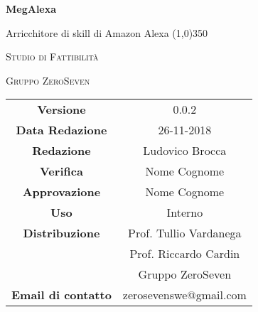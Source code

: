 \documentclass[a4paper,12pt]{book}
\author{Mirko Franco}
\date{26-11-2018}
\begin{document}
\begin{titlepage}
	\centering
	{\huge\bfseries MegAlexa\par}
	Arricchitore di skill di Amazon Alexa
	\line(1,0){350} \\
	{\scshape\LARGE Studio di Fattibilità \par}
	\vspace{1cm}
	{\scshape Gruppo ZeroSeven \par}
	\logo
	\begin{tabular}{c|c}
		{\hfill \textbf{Versione}} 			& 0.0.2				\\
		{\hfill\textbf{Data Redazione}} 	& 26-11-2018		\\ 
		{\hfill\textbf{Redazione}} 			&  		Ludovico Brocca			\\ 
		{\hfill\textbf{Verifica}} 				&  	Nome Cognome				\\ 
		{\hfill\textbf{Approvazione}} 		&  		Nome Cognome			\\ 
		{\hfill\textbf{Uso}} 					& 		Interno		\\ 
		{\hfill\textbf{Distribuzione}} 			& 			Prof. Tullio Vardanega \\ & Prof. Riccardo Cardin \\ & Gruppo ZeroSeven		\\ 
		{\hfill\textbf{Email di contatto}} & zerosevenswe@gmail.com \\
	\end{tabular}
\end{titlepage}
	

	
\label{LastFrontPage}
	\newpage	
	
	\pagestyle{mymain}
	\tableofcontents
		
	
	
	
			
			
		
	
	\label{LastPage}
\end{document}
